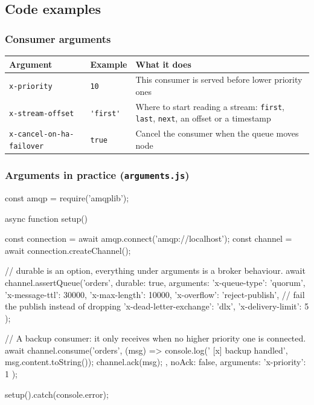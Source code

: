 \documentclass[11pt,a4paper]{article}
\begin{document}
\newpage
\subsection{Code examples}

\subsubsection*{Consumer arguments}

\begin{table}[h]
\centering
\small
\begin{tabularx}{\textwidth}{@{}llX@{}}
\toprule
\rowcolor{tablehead}
\textbf{\color{accent}Argument} & \textbf{\color{accent}Example} & \textbf{\color{accent}What it does} \\
\midrule
\lstinline|x-priority|       & \lstinline|10|      & This consumer is served before lower priority ones \\
\lstinline|x-stream-offset|  & \lstinline|'first'| & Where to start reading a stream: \lstinline|first|, \lstinline|last|, \lstinline|next|, an offset or a timestamp \\
\lstinline|x-cancel-on-ha-failover| & \lstinline|true| & Cancel the consumer when the queue moves node \\
\bottomrule
\end{tabularx}
\end{table}

\subsubsection*{Arguments in practice (\texttt{arguments.js})}
\begin{js}[basicstyle=\ttfamily\scriptsize]
const amqp = require('amqplib');

async function setup() {
    const connection = await amqp.connect('amqp://localhost');
    const channel = await connection.createChannel();

    // durable is an option, everything under arguments is a broker behaviour.
    await channel.assertQueue('orders', {
        durable: true,
        arguments: {
            'x-queue-type': 'quorum',
            'x-message-ttl': 30000,
            'x-max-length': 10000,
            'x-overflow': 'reject-publish',      // fail the publish instead of dropping
            'x-dead-letter-exchange': 'dlx',
            'x-delivery-limit': 5
        }
    });

    // A backup consumer: it only receives when no higher priority one is connected.
    await channel.consume('orders', (msg) => {
        console.log(' [x] backup handled', msg.content.toString());
        channel.ack(msg);
    }, { noAck: false, arguments: { 'x-priority': 1 } });
}

setup().catch(console.error);
\end{js}
\end{document}
